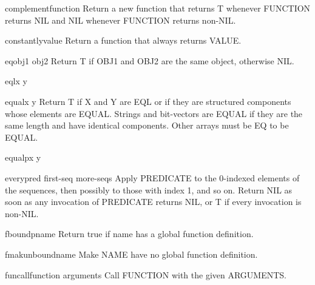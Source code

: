 \begin{function}{complement}{function}{}{}
  Return a new function that returns T whenever FUNCTION returns NIL and
   NIL whenever FUNCTION returns non-NIL.
\end{function}

\begin{function}{constantly}{value}{}{}
  Return a function that always returns VALUE.
\end{function}

\begin{function}{eq}{obj1 obj2}{}{}
  Return T if OBJ1 and OBJ2 are the same object, otherwise NIL.
\end{function}

\begin{function}{eql}{x y}{}{}
  
\end{function}

\begin{function}{equal}{x y}{}{}
  Return T if X and Y are EQL or if they are structured components whose
elements are EQUAL. Strings and bit-vectors are EQUAL if they are the same
length and have identical components. Other arrays must be EQ to be EQUAL.
\end{function}

\begin{function}{equalp}{x y}{}{}
  
\end{function}

\begin{function}{every}{pred first-seq \rest more-seqs}{}{}
  Apply PREDICATE to the 0-indexed elements of the sequences, then
   possibly to those with index 1, and so on. Return NIL as soon
   as any invocation of PREDICATE returns NIL, or T if every invocation
   is non-NIL.
\end{function}

\begin{function}{fboundp}{name}{}{}
  Return true if name has a global function definition.
\end{function}

\begin{function}{fmakunbound}{name}{}{}
  Make NAME have no global function definition.
\end{function}

\begin{function}{funcall}{function \rest arguments}{}{}
  Call FUNCTION with the given ARGUMENTS.
\end{function}


